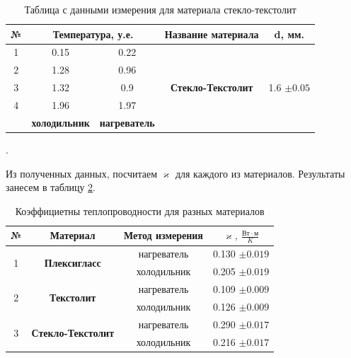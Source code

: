 \documentclass[a4paper, 12pt]{article}
\newcounter{Points}
\newcommand{\point}{\arabic{Points}. \addtocounter{Points}{1}}
\begin{document}
    \begin{table}[h]
    \centering
    \begin{tabular}{|c|c|c|c|c|}
    
    \hline
    №	&	\multicolumn{2}{c}{Температура,	у.е.}	&	Название	материала	&	d,	мм.	\\\hline
    
    1	&	0.15	&	0.22	&	
    &	\\\cline{1-3}
    2	&	1.28	&	0.96	&	
    \multirow{3}{*}{\textbf{Стекло-Текстолит}}	&	\multirow{3}{*}{1.6	$\pm	0.05$}	\\\cline{1-3}
    
    3	&	1.32	&	0.9	&	
    &	\\\cline{1-3}
    4	&	1.96	&	1.97	&	
    &	\\\cline{1-3}
        &	\textbf{холодильник}	&	\textbf{нагреватель}	&	&
    \\\hline
    \end{tabular}
    
    \caption{Таблица с данными измерения для материала стекло-текстолит}
    \label{tabl:2}
\end{table}

\point Из полученных данных, посчитаем $\varkappa$ для каждого из материалов. Результаты занесем в таблицу \ref{tabl:results}.

\begin{table}[h]
    \centering
    \begin{tabular}{|c|c|c|c|}
    \hline
    
    № & Материал & Метод измерения & $\varkappa,~\frac{Вт \cdot м}{K}$ \\ \hline
    \multirow{2}{*}{1} & \multirow{2}{*}{\textbf{Плексигласс}} & нагреватель  & 0.130 $\pm 0.019$ \\ \cline{3-4}
    & & холодильник  & 0.205 $\pm 0.019$ \\ \hline
    
    \multirow{2}{*}{2} & \multirow{2}{*}{\textbf{Текстолит}} &нагреватель  & 0.109 $\pm 0.009$ \\ \cline{3-4}
    & & холодильник  & 0.126 $\pm 0.009$ \\ \hline

    \multirow{2}{*}{3} & \multirow{2}{*}{\textbf{Стекло-Текстолит}} & нагреватель  & 0.290 $\pm 0.017$ \\ \cline{3-4}
    & & холодильник  & 0.216 $\pm 0.017$ \\ \hline
    
\end{tabular}

    \caption{Коэффициетны теплопроводности для разных материалов}
    \label{tabl:results}
\end{table}
\end{document}
